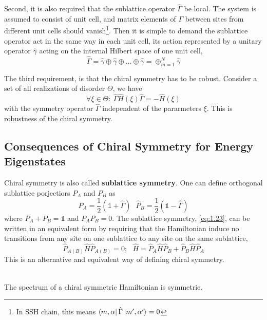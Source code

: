 Second, it is also required that the sublattice operator $\hat{\Gamma}$ be local.
The system is assumed to consist of unit cell, and matrix elements of $\Gamma$ between sites from different unit cells should vanish\footnote{In SSH chain, this means $\bra{m,\alpha} \hat{\Gamma} \ket{m',\alpha'}=0$}.
Then it is simple to demand the sublattice operator act in the same way in each unit cell, its action represented by a unitary operator $\hat{\gamma}$ acting on the internal Hilbert space of one unit cell,
\begin{equation}
    \hat{\Gamma} = \hat{\gamma} \oplus \hat{\gamma} \oplus \dots \oplus \hat{\gamma} =  \oplus_{m=1}^N \hat{\gamma}
    \label{eq:1.26}
\end{equation}

The third requirement, is that the chiral symmetry has to be robust.
Consider a set of all realizations of disorder $\Theta$, we have
\begin{equation}
    \forall \xi \in \Theta: ~ \hat{\Gamma} \hat{H}(\xi) \hat{\Gamma} = - \hat{H}(\xi)
    \label{eq:1.27}
\end{equation}
with the symmetry operator $\hat{\Gamma}$ independent of the pararmeters $\xi$.
This is robustness of the chiral symmetry.

\subsection{Consequences of Chiral Symmetry for Energy Eigenstates}\label{sec:1.4.3}
Chiral symmetry is also called \textbf{sublattice symmetry}.
One can define orthogonal sublattice porjectiors $P_A$ and $P_B$ as
\begin{equation}
    \hat{P}_A = \frac{1}{2} \left(\mathbb{1} + \hat{\Gamma} \right) ~ ~ ~ \hat{P}_B = \frac{1}{2} \left(\mathbb{1} - \hat{\Gamma} \right)
    \label{eq:1.28}
\end{equation}
where $P_A + P_B = \mathbb{1}$ and $P_A P_B = 0$.
The sublattice symmetry, \eqref{eq:1.23}, can be written in an equivalent form by requiring that the Hamiltonian induce no transitions from any site on one sublattice to any site on the same sublattice,
\begin{equation}
    \hat{P}_{A(B)} \hat{H} \hat{P}_{A(B)} = 0; ~ ~ ~ \hat{H} = \hat{P}_A \hat{H} \hat{P}_B + \hat{P}_B \hat{H} \hat{P}_A
    \label{eq:1.29}
\end{equation}
This is an alternative and equivalent way of defining chiral symmetry.

\\
The spectrum of a chiral symmetric Hamiltonian is symmetric.

